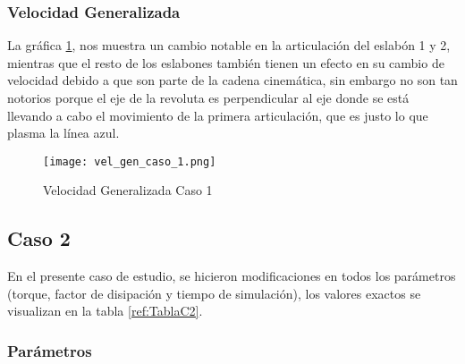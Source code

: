     \subsubsection{Velocidad Generalizada}
    La gráfica \ref{fig:VelGenC1}, nos muestra un cambio notable en la articulación del eslabón 1 y 2, mientras que el resto de los eslabones también tienen un efecto en su cambio de velocidad debido a que son parte de la cadena cinemática, sin embargo no son tan notorios porque el eje de la revoluta es perpendicular al eje donde se está llevando a cabo el movimiento de la primera articulación, que es justo lo que plasma la línea azul.

    \begin{figure}[H]%
            \centering
            \texttt{[image: vel\_gen\_caso\_1.png]} 
        \caption{Velocidad Generalizada Caso 1}
        \label{fig:VelGenC1}
    \end{figure}

\subsection{Caso 2}
    En el presente caso de estudio, se hicieron modificaciones en todos los parámetros (torque, factor de disipación y tiempo de simulación), los valores exactos se visualizan en la tabla \ref{ref:TablaC2}.
    \subsubsection{Parámetros} 

    \begin{table}[H]%
        \centering
        \begin{center}
        \caption{Parámetros modificados del simulador (Sistema No Conservativo)} 
        \centering
        \bigskip
        \end{center}
        \label{ref:TablaC2}
    \end{table}

